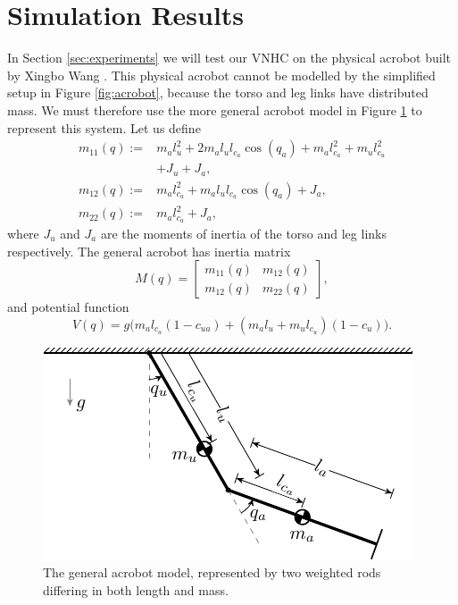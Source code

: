 \documentclass[journal,twoside,web]{ieeecolor}
\begin{document}
{%
\section{Simulation Results}\label{sec:simulations}
In Section \ref{sec:experiments} we will test our VNHC on the physical acrobot
built by Xingbo Wang \cite{xingbo_thesis}.
This physical acrobot cannot be modelled by the simplified setup in Figure
\ref{fig:acrobot}, because the torso and leg links have 
distributed mass. 
We must therefore use the more general acrobot model in Figure
\ref{fig:acrobot-model} to represent this system.
Let us define 
\begin{align*}
    m_{11}(q) := &m_a l_u^2 + 2m_al_ul_{c_a}\cos(q_a) + m_al_{c_a}^2 +
    m_ul_{c_u}^2 \\
                 &+ J_u + J_a
                 , \\
    m_{12}(q) := &m_al_{c_a}^2 + m_al_ul_{c_a}\cos(q_a) + J_a
    , \\
    m_{22}(q) := &m_al_{c_a}^2 + J_a,
\end{align*}
where \(J_u\) and \(J_a\) are the moments of inertia of the torso and leg links
respectively. 
The general acrobot has inertia matrix
\begin{equation*}
    M(q) = \begin{bmatrix}
        m_{11}(q) & m_{12}(q) \\
        m_{12}(q) & m_{22}(q)
    \end{bmatrix}
    ,
\end{equation*}
and potential function
\begin{equation*}
    V(q) = g\big(m_al_{c_a}(1-c_{ua})
    + (m_al_u + m_ul_{c_u})(1-c_u)\big)
    .
\end{equation*}

\begin{figure}
    \centering
    \includegraphics[width=0.8\linewidth]{acrobot_model.pdf}
    \caption{The general acrobot model, represented by two weighted rods
    differing in both length and mass.}%
    \label{fig:acrobot-model}
\end{figure}

}
\end{document}
